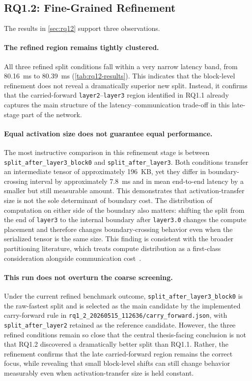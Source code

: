 \subsection{RQ1.2: Fine-Grained Refinement}
\label{sec:analysis-rq12}

The results in \cref{sec:rq12} support three observations.

\paragraph{The refined region remains tightly clustered.}
All three refined split conditions fall within a very narrow latency band,
from 80.16~ms to 80.39~ms (\cref{tab:rq12-results}). This indicates that the
block-level refinement does not reveal a dramatically superior new split.
Instead, it confirms that the carried-forward \texttt{layer2}--\texttt{layer3}
region identified in RQ1.1 already captures the main structure of the
latency--communication trade-off in this late-stage part of the network.

\paragraph{Equal activation size does not guarantee equal performance.}
The most instructive comparison in this refinement stage is between
\texttt{split\_after\_layer3\_block0} and \texttt{split\_after\_layer3}. Both
conditions transfer an intermediate tensor of approximately 196~KB, yet they
differ in boundary-crossing interval by approximately 7.8~ms and in mean
end-to-end latency by a smaller but still measurable amount. This demonstrates
that activation-transfer size is not the sole determinant of boundary cost. The
distribution of computation on either side of the boundary also matters:
shifting the split from the end of \texttt{layer3} to the internal boundary
after \texttt{layer3.0} changes the compute placement and therefore changes
boundary-crossing behavior even when the serialized tensor is the same size.
This finding is consistent with the broader partitioning literature, which
treats compute distribution as a first-class consideration alongside
communication cost~\cite{dnnsplit, deeperthings, survey_partitioning,
fine_grained_partitioning, hierarchical_partitioning}.

\paragraph{This run does not overturn the coarse screening.}
Under the current refined benchmark outcome, \texttt{split\_after\_layer3\_block0}
is the raw-fastest split and is selected as the main candidate by the
implemented carry-forward rule in
\texttt{rq1\_2\_20260515\_112636/carry\_forward.json}, with
\texttt{split\_after\_layer2} retained as the reference candidate. However,
the three refined conditions remain so close that the central thesis-facing
conclusion is not that RQ1.2 discovered a dramatically better split than
RQ1.1. Rather, the refinement confirms that the late carried-forward region
remains the correct focus, while revealing that small block-level shifts can
still change behavior measurably even when activation-transfer size is held
constant.

